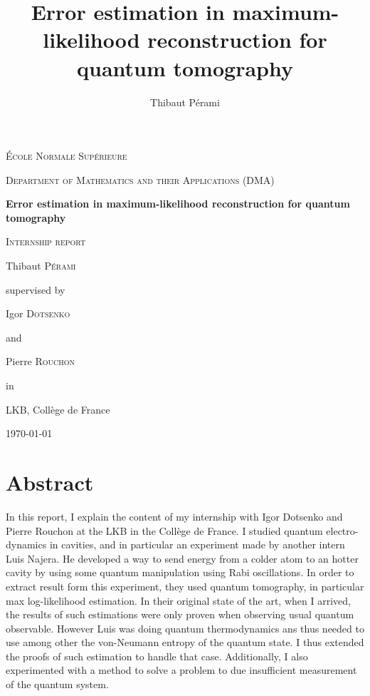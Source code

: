 \documentclass[10pt,a4paper]{report}
\title{Error estimation in maximum-likelihood reconstruction for quantum tomography}
\author{Thibaut Pérami}
\theoremstyle{plain}
\theoremstyle{definition}
\theoremstyle{remark}
\begin{document}
\begin{titlepage}
  \centering
  {\scshape\huge École Normale Supérieure \par}
  \vspace{0.3cm}
  {\scshape\Large Department of Mathematics and their Applications (DMA) \par}
  \vspace{3cm}
  {\Huge\bfseries Error estimation in maximum-likelihood reconstruction for quantum tomography \par}
  \vspace{0.5cm}
  {\scshape\Large Internship report\par}
  \vspace{3cm}
  {\LARGE Thibaut \textsc{Pérami}\par}
  \vfill
  {
    \large
    supervised by\par
    Igor \textsc{Dotsenko}\par
    and\par
    Pierre \textsc{Rouchon}\par
  in\par
  LKB, Collège de France
  }

  \vfill

  {\Large \today\par}
\end{titlepage}

\newcommand{\fset}{\ensuremath{\mathop{\text{\textquotesingle}}}}


\tableofcontents


\chapter*{Abstract}
In this report, I explain the content of my internship with Igor Dotsenko and
Pierre Rouchon at the LKB in the Collège de France. I studied quantum
electro-dynamics in cavities, and in particular an experiment made by another
intern Luis Najera. He developed a way to send energy from a colder atom to an
hotter cavity by using some quantum manipulation using Rabi oscillations. In
order to extract result form this experiment, they used quantum tomography, in
particular max log-likelihood estimation. In their original state of the art, when I
arrived, the results of such estimations were only proven when observing usual
quantum observable. However Luis was doing quantum thermodynamics ans thus
needed to use among other the von-Neumann entropy of the quantum state. I thus
extended the proofs of such estimation to handle that case. Additionally, I also experimented
with a method to solve a problem to due insufficient measurement of the quantum system.
\end{document}

